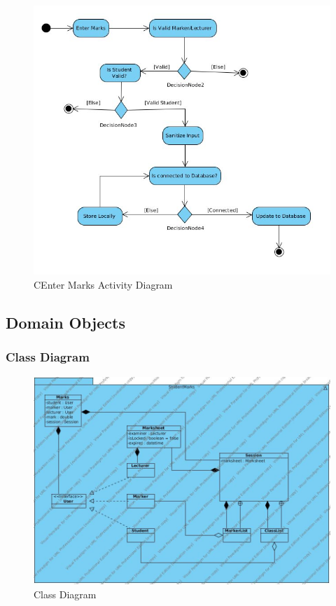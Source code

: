 \documentclass[a4paper]{article}
\begin{document}
			\begin{figure}[H]
				\centering
				\includegraphics[width=1\textwidth]{EnterMarksActivityDiagram}
				\caption{CEnter Marks Activity Diagram}
			\end{figure}

		\subsection{Domain Objects}
		
			\subsubsection{Class Diagram}
			
			\begin{figure}[h]
				\caption{Class Diagram}
				\includegraphics[width=1\textwidth]{StudentMarksClassDiagram}
			\end{figure}
\end{document}
